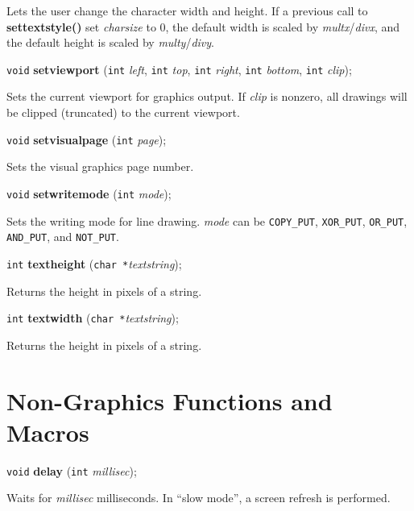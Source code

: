 \documentclass[a4paper,11pt]{article}
\newcommand{\V}{\texttt{void}}      %
\newcommand{\I}{\texttt{int}}       %
\newcommand{\C}{\texttt{char *}}    %
\newcommand{\func}[1]{\textbf{#1}}  %
\newcommand{\A}[1]{\emph{#1}}       %
\newcommand{\T}[1]{\texttt{#1}}     %
\newenvironment{bgi}
{ %
  \begin{snugshade}
}
{ %
  \end{snugshade}
}
\begin{document}
Lets the user change the character width and height. If a previous
call to \func{settextstyle()} set \A{charsize} to 0, the default width
is scaled by \A{multx}/\A{divx}, and the default height is scaled by
\A{multy}/\A{divy}.


\begin{bgi}
\V{} \func{setviewport} (\I{} \A{left}, \I{} \A{top}, \I{} \A{right},
\I{} \A{bottom}, \I{} \A{clip});
\end{bgi}

Sets the current viewport for graphics output. If \A{clip} is nonzero,
all drawings will be clipped (truncated) to the current viewport.


\begin{bgi}
\V{} \func{setvisualpage} (\I{} \A{page});
\end{bgi}

Sets the visual graphics page number.


\begin{bgi}
\V{} \func{setwritemode} (\I{} \A{mode});
\end{bgi}

Sets the writing mode for line drawing. \A{mode} can be \T{COPY\_PUT},
\T{XOR\-\_PUT}, \T{OR\_PUT}, \T{AND\_PUT}, and \T{NOT\_PUT}.


\begin{bgi}
\I{} \func{textheight} (\C{}\A{textstring});
\end{bgi}

Returns the height in pixels of a string.


\begin{bgi}
\I{} \func{textwidth} (\C{}\A{textstring});
\end{bgi}

Returns the height in pixels of a string.


\section{Non-Graphics Functions and Macros}

\begin{bgi}
\V{} \func{delay} (\I{} \A{millisec});
\end{bgi}

Waits for \A{millisec} milliseconds. In ``slow mode'', a screen
refresh is performed.
\end{document}
